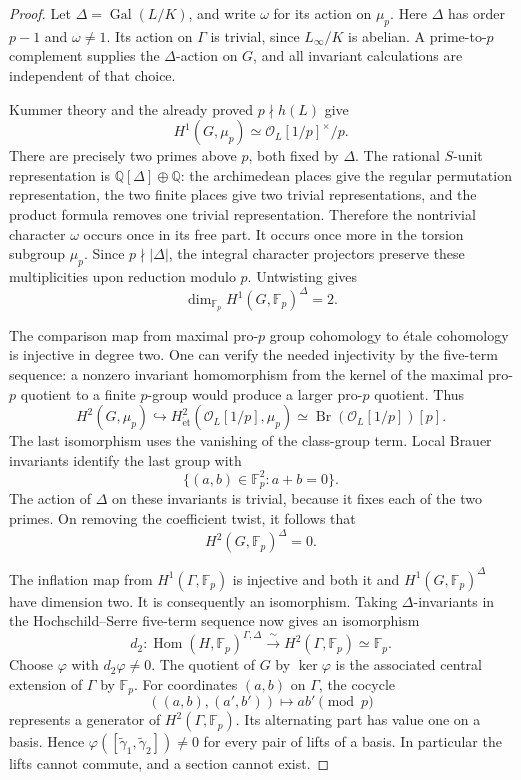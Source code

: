 \documentclass[11pt]{article}
\theoremstyle{definition}\newtheorem{definition}[theorem]{Definition}
\begin{document}
\begin{proof}
Let \(\Delta=\operatorname{Gal}(L/K)\), and write \(\omega\)
for its action on \(\mu_p\). Here \(\Delta\) has order \(p-1\)
and \(\omega\ne1\). Its action on \(\Gamma\) is trivial, since
\(L_\infty/K\) is abelian. A prime-to-\(p\) complement supplies
the \(\Delta\)-action on \(G\), and all invariant calculations
are independent of that choice.

Kummer theory and the already proved \(p\nmid h(L)\) give
\[
 H^1(G,\mu_p)\simeq\mathcal O_L[1/p]^\times/p .
\]
There are precisely two primes above \(p\), both fixed by
\(\Delta\). The rational \(S\)-unit representation is
\(\mathbb Q[\Delta]\oplus\mathbb Q\): the archimedean places
give the regular permutation representation, the two finite
places give two trivial representations, and the product
formula removes one trivial representation. Therefore the
nontrivial character \(\omega\) occurs once in its free part.
It occurs once more in the torsion subgroup \(\mu_p\).
Since \(p\nmid|\Delta|\), the integral character projectors
preserve these multiplicities upon reduction modulo \(p\).
Untwisting gives
\[
 \dim_{\mathbb F_p}H^1(G,\mathbb F_p)^\Delta=2.
\]

The comparison map from maximal pro-\(p\) group cohomology
to \'{e}tale cohomology is injective in degree two.
One can verify the needed injectivity by the five-term
sequence: a nonzero invariant homomorphism from the kernel
of the maximal pro-\(p\) quotient to a finite \(p\)-group
would produce a larger pro-\(p\) quotient. Thus
\[
 H^2(G,\mu_p)\hookrightarrow
 H^2_{\mathrm{\acute et}}(\mathcal O_L[1/p],\mu_p)
 \simeq\operatorname{Br}(\mathcal O_L[1/p])[p].
\]
The last isomorphism uses the vanishing of the class-group
term. Local Brauer invariants identify the last group with
\[
 \{(a,b)\in\mathbb F_p^2:a+b=0\}.
\]
The action of \(\Delta\) on these invariants is trivial,
because it fixes each of the two primes. On removing the
coefficient twist, it follows that
\[
 H^2(G,\mathbb F_p)^\Delta=0.
\]

The inflation map from \(H^1(\Gamma,\mathbb F_p)\) is
injective and both it and \(H^1(G,\mathbb F_p)^\Delta\)
have dimension two. It is consequently an isomorphism.
Taking \(\Delta\)-invariants in the Hochschild--Serre
five-term sequence now gives an isomorphism
\[
 d_2:\operatorname{Hom}(H,\mathbb F_p)^{\Gamma,\Delta}
       \xrightarrow{\ \sim\ }
       H^2(\Gamma,\mathbb F_p)\simeq\mathbb F_p .
\]
Choose \(\varphi\) with \(d_2\varphi\ne0\). The quotient
of \(G\) by \(\ker\varphi\) is the associated central
extension of \(\Gamma\) by \(\mathbb F_p\).
For coordinates \((a,b)\) on \(\Gamma\), the cocycle
\[
 ((a,b),(a',b'))\longmapsto ab'\pmod p
\]
represents a generator of \(H^2(\Gamma,\mathbb F_p)\).
Its alternating part has value one on a basis. Hence
\(\varphi([\widetilde\gamma_1,\widetilde\gamma_2])\ne0\)
for every pair of lifts of a basis. In particular the
lifts cannot commute, and a section cannot exist.
\end{proof}
\end{document}
